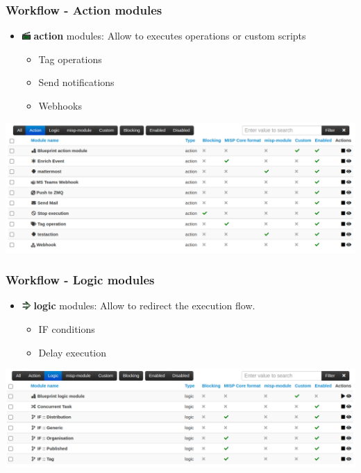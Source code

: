 \begin{frame}
    \frametitle{Workflow - Action modules}
    \begin{itemize}
        \item \includegraphics[width=12px]{pictures/sc-action-icon.png} \textbf{action} modules: Allow to executes operations or custom scripts
        \begin{itemize}
            \item Tag operations
            \item Send notifications
            \item Webhooks
        \end{itemize}
    \end{itemize}
    \begin{center}
        \includegraphics[width=1.0\linewidth]{pictures/action-module-index.png}
    \end{center}
\end{frame}

\begin{frame}
    \frametitle{Workflow - Logic modules}
    \begin{itemize}
        \item \includegraphics[width=12px]{pictures/sc-condition-icon.png} \textbf{logic} modules: Allow to redirect the execution flow.
        \begin{itemize}
            \item IF conditions
            \item Delay execution
        \end{itemize}
    \end{itemize}
    \begin{center}
        \includegraphics[width=1.0\linewidth]{pictures/logic-module-index.png}
    \end{center}
\end{frame}

